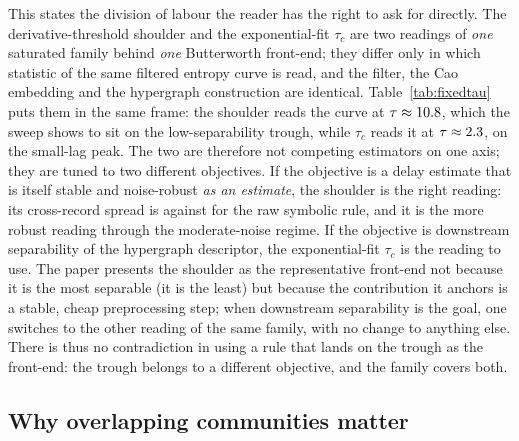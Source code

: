\documentclass[10pt,a4paper,twocolumn]{article}
\begin{document}
This states the division of labour the reader has the right to ask for
directly.  The derivative-threshold shoulder and the exponential-fit $\tau_c$
are two readings of \emph{one} saturated family behind \emph{one} Butterworth
front-end; they differ only in which statistic of the same filtered entropy
curve is read, and the filter, the Cao embedding and the hypergraph construction
are identical.  Table~\ref{tab:fixedtau} puts them in the same frame: the
shoulder reads the curve at $\tau\approx10.8$, which the sweep shows to
sit on the low-separability trough, while $\tau_c$ reads it at
$\tau\approx2.3$, on the small-lag peak.  The two are therefore not
competing estimators on one axis; they are tuned to two different objectives.
If the objective is a delay estimate that is itself stable and noise-robust
\emph{as an estimate}, the shoulder is the right reading: its cross-record
spread is \rotorTauStdLPF{} against \rotorTauStdSE{} for the raw symbolic rule,
and it is the more robust reading through the moderate-noise regime.  If the
objective is downstream separability of the hypergraph descriptor, the
exponential-fit $\tau_c$ is the reading to use.  The paper presents the shoulder
as the representative front-end not because it is the most separable
(it is the least) but because the contribution it anchors is a stable, cheap
preprocessing step; when downstream separability is the goal, one switches to
the other reading of the same family, with no change to anything else.  There
is thus no contradiction in using a rule that lands on the trough as the
front-end: the trough belongs to a different objective, and the family covers
both.

\subsection{Why overlapping communities matter}
\end{document}
